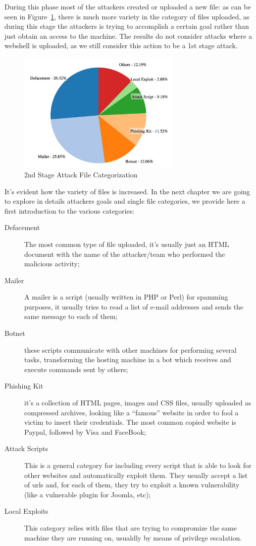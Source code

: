 During this phase most of the attackers created or uploaded a new file: as can be seen in Figure~\ref{fig:2ndStageAttack}, there is much more variety in the category of files uploaded, as during this stage the attackers is trying to accomplish a certain goal rather than just obtain an access to the machine. The results do not consider attacks where a webshell is uploaded, as we still consider this action to be a 1st stage attack.

\begin{figure}[tbh]
\centerline{\includegraphics[width=0.7\textwidth]{Images/2ndStageAttack.jpg}}
\caption{2nd Stage Attack File Categorization\label{fig:2ndStageAttack}}
\end{figure}

It's evident how the variety of files is increased. In the next chapter we are going to explore in details attackers goals and single file categories, we provide here a first introduction to the various categories:

\begin{description}
\item[Defacement] The most common type of file uploaded, it's usually just an HTML document with the name of the attacker/team who performed the malicious activity;
\item[Mailer] A mailer is a script (usually written in PHP or Perl) for spamming purposes, it usually tries to read a list of e-mail addresses and sends the same message to each of them;
\item[Botnet] these scripts communicate with other machines for performing several tasks, transforming the hosting machine in a bot which receives and execute commands sent by others;
\item[Phishing Kit] it's a collection of HTML pages, images and CSS files, usually uploaded as compressed archives, looking like a ``famous'' website in order to fool a victim to insert their credentials. The most common copied website is Paypal, followed by Visa and FaceBook;
\item[Attack Scripts] This is a general category for including every script that is able to look for other websites and automatically exploit them. They usually accept a list of urls and, for each of them, they try to exploit a known vulnerability (like a vulnerable plugin for Joomla, etc);
\item[Local Exploits] This category relies with files that are trying to compromize the same machine they are running on, usualdly by means of privilege escalation.
\end{description}

